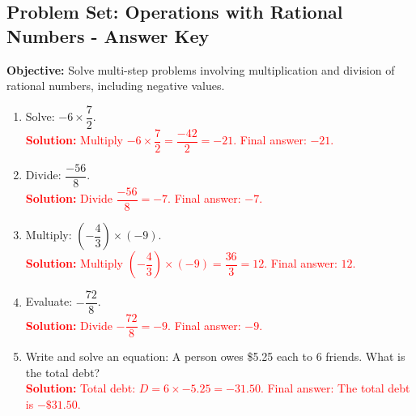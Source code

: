 \documentclass[11pt]{article}
\title{}
\date{}
\begin{document}
\subsection*{Problem Set: Operations with Rational Numbers - Answer Key}
\onehalfspacing

\begin{tcolorbox}[colframe=black!40, colback=gray!5, 
coltitle=black, colbacktitle=black!20, fonttitle=\bfseries\Large, 
title=Learning Objective, halign title=center, left=5pt, right=5pt, top=5pt, bottom=15pt]
\textbf{Objective:} Solve multi-step problems involving multiplication and division of rational numbers, including negative values.
\end{tcolorbox}

\begin{tcolorbox}[colframe=black!60, colback=white, 
coltitle=black, colbacktitle=black!15, fonttitle=\bfseries\Large, 
title=Exercises, halign title=center, left=10pt, right=10pt, top=10pt, bottom=60pt]
\begin{enumerate}[itemsep=1em]
    \item Solve: \( -6 \times \dfrac{7}{2} \).\\
    \textcolor{red}{\textbf{Solution:} Multiply \( -6 \times \dfrac{7}{2} = \dfrac{-42}{2} = -21 \). Final answer: \( -21 \).}

    \item Divide: \( \dfrac{-56}{8} \).\\
    \textcolor{red}{\textbf{Solution:} Divide \( \dfrac{-56}{8} = -7 \). Final answer: \( -7 \).}

    \item Multiply: \( (-\dfrac{4}{3}) \times (-9) \).\\
    \textcolor{red}{\textbf{Solution:} Multiply \( (-\dfrac{4}{3}) \times (-9) = \dfrac{36}{3} = 12 \). Final answer: \( 12 \).}

    \item Evaluate: \( -\dfrac{72}{8} \).\\
    \textcolor{red}{\textbf{Solution:} Divide \( -\dfrac{72}{8} = -9 \). Final answer: \( -9 \).}

    \item Write and solve an equation: A person owes \$5.25 each to 6 friends. What is the total debt?\\
    \textcolor{red}{\textbf{Solution:} Total debt: \( D = 6 \times -5.25 = -31.50 \). Final answer: The total debt is \( -\$31.50 \).}


\end{enumerate}
\end{tcolorbox}
\end{document}
